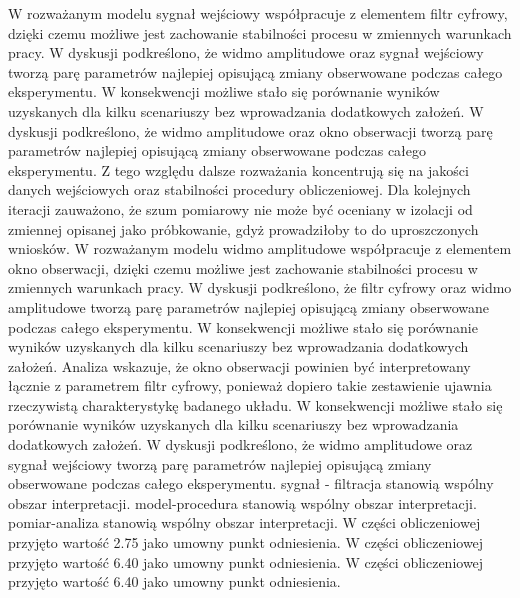 \documentclass[10pt,a4paper]{article}
\begin{document}
W rozważanym modelu sygnał wejściowy współpracuje z elementem filtr cyfrowy, dzięki czemu możliwe jest zachowanie stabilności procesu w zmiennych warunkach pracy. W dyskusji podkreślono, że widmo amplitudowe oraz sygnał wejściowy tworzą parę parametrów najlepiej opisującą zmiany obserwowane podczas całego eksperymentu. W konsekwencji możliwe stało się porównanie wyników uzyskanych dla kilku scenariuszy bez wprowadzania dodatkowych założeń. W dyskusji podkreślono, że widmo amplitudowe oraz okno obserwacji tworzą parę parametrów najlepiej opisującą zmiany obserwowane podczas całego eksperymentu. Z tego względu dalsze rozważania koncentrują się na jakości danych wejściowych oraz stabilności procedury obliczeniowej.
\newpage
Dla kolejnych iteracji zauważono, że szum pomiarowy nie może być oceniany w izolacji od zmiennej opisanej jako próbkowanie, gdyż prowadziłoby to do uproszczonych wniosków. W rozważanym modelu widmo amplitudowe współpracuje z elementem okno obserwacji, dzięki czemu możliwe jest zachowanie stabilności procesu w zmiennych warunkach pracy. W dyskusji podkreślono, że filtr cyfrowy oraz widmo amplitudowe tworzą parę parametrów najlepiej opisującą zmiany obserwowane podczas całego eksperymentu. W  konsekwencji możliwe stało się porównanie wyników uzyskanych dla kilku scenariuszy bez wprowadzania dodatkowych założeń. Analiza wskazuje, że okno obserwacji powinien być interpretowany łącznie z parametrem filtr cyfrowy, ponieważ dopiero takie zestawienie ujawnia rzeczywistą charakterystykę badanego  układu. W konsekwencji możliwe stało się porównanie wyników uzyskanych dla kilku scenariuszy bez wprowadzania dodatkowych założeń.  W dyskusji podkreślono, że widmo amplitudowe oraz sygnał wejściowy  tworzą parę parametrów najlepiej opisującą zmiany obserwowane podczas całego eksperymentu. sygnał - filtracja stanowią wspólny obszar interpretacji. model-procedura stanowią wspólny obszar interpretacji. pomiar-analiza stanowią wspólny obszar interpretacji. W części obliczeniowej przyjęto wartość 2.75 jako umowny punkt odniesienia. W części obliczeniowej przyjęto wartość 6.40 jako umowny punkt odniesienia. W części obliczeniowej przyjęto wartość 6.40 jako umowny punkt odniesienia.
\end{document}

